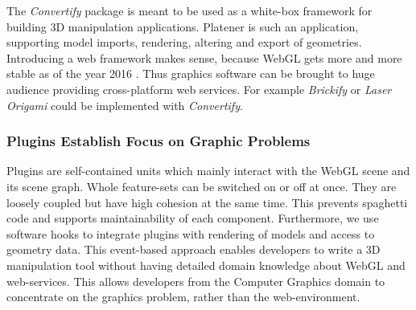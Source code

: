 \documentclass[../ClassicThesis.tex]{subfiles}
\begin{document}
The \emph{Convertify} package is meant to be used as a white-box framework for building
3D manipulation applications. Platener is such an application, supporting model
imports, rendering, altering and export of geometries. Introducing a web
framework makes sense, because WebGL gets more and more stable as of the year
2016 . Thus graphics software can be brought to huge
audience providing cross-platform web services. For example \emph{Brickify} or \emph{Laser
Origami} could be implemented with \emph{Convertify}.


\subsubsection{Plugins Establish Focus on Graphic Problems}

Plugins are self-contained units which mainly interact with the WebGL scene and
its scene graph. Whole feature-sets can be switched on or off at once. They are
loosely coupled but have high cohesion at the same time. This prevents spaghetti
code and supports maintainability of each component. Furthermore, we use
software hooks to integrate plugins with rendering of models and access to
geometry data. This event-based approach enables developers to write a 3D
manipulation tool without having detailed domain knowledge about WebGL and
web-services. This allows developers from the Computer Graphics domain to
concentrate on the graphics problem, rather than the web-environment.

\end{document}
